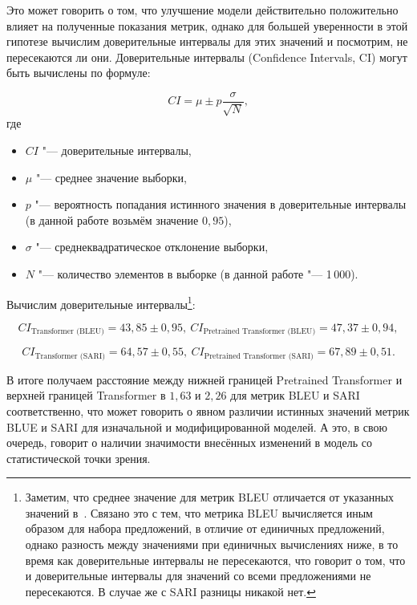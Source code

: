 Это может говорить о том, что улучшение модели действительно положительно влияет на полученные показания метрик, однако для большей уверенности в этой гипотезе вычислим доверительные интервалы для этих значений и посмотрим, не пересекаются ли они. Доверительные интервалы (Confidence Intervals, CI) могут быть вычислены по формуле:

\begin{equation}%
  \label{ci-formula}
  CI = \mu \pm p \frac{\sigma}{\sqrt{N}},
\end{equation}
где
\begin{itemize}%
  \item $CI$ "--- доверительные интервалы,
  \item $\mu$ "--- среднее значение выборки,
  \item $p$ "--- вероятность попадания истинного значения в доверительные интервалы (в данной работе возьмём значение $0{,}95$),
  \item $\sigma$ "--- среднеквадратическое отклонение выборки,
  \item $N$ "--- количество элементов в выборке (в данной работе "--- 1\,000).
\end{itemize}

Вычислим доверительные интервалы\footnote{Заметим, что среднее значение для метрик BLEU отличается от указанных значений в~. Связано это с тем, что метрика BLEU вычисляется иным образом для набора предложений, в отличие от единичных предложений, однако разность между значениями при единичных вычислениях ниже, в то время как доверительные интервалы не пересекаются, что говорит о том, что и доверительные интервалы для значений со всеми предложениями не пересекаются. В случае же с SARI разницы никакой нет.}:

\begin{equation}\label{bleu-ci}%
  CI_{\text{Transformer (BLEU)}} = 43{,}85 \pm 0{,}95, \
  CI_{\text{Pretrained Transformer (BLEU)}} = 47{,}37 \pm 0{,}94,
\end{equation}

\begin{equation}\label{sari-ci}%
  CI_{\text{Transformer (SARI)}} = 64{,}57 \pm 0{,}55, \
  CI_{\text{Pretrained Transformer (SARI)}} = 67{,}89 \pm 0{,}51.
\end{equation}

В итоге получаем расстояние между нижней границей Pretrained Transformer и верхней границей Transformer в $1{,}63$ и $2{,}26$ для метрик BLEU и SARI соответственно, что может говорить о явном различии истинных значений метрик BLUE и SARI для изначальной и модифицированной моделей.
А это, в свою очередь, говорит о наличии значимости внесённых изменений в модель со статистической точки зрения.


